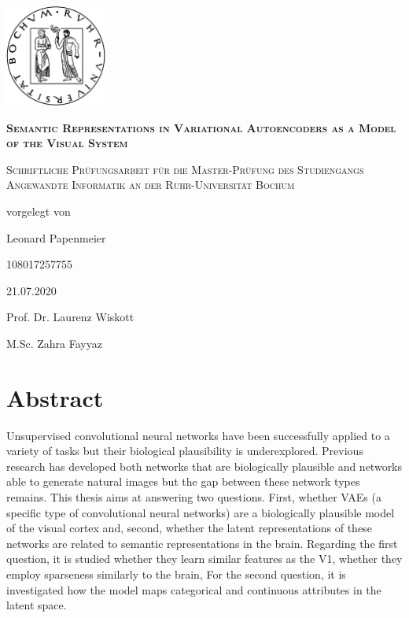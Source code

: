 \documentclass[11pt,a4paper]{article}
\let\oldsection\section
\renewcommand\section{\clearpage\oldsection}
\begin{document}
\begin{titlepage}
\centering
\includegraphics[width=0.25\textwidth]{rublogo.png}\par
{\scshape\huge\bfseries Semantic Representations in Variational Autoencoders as a Model of the Visual System \par}
{\scshape\large Schriftliche Prüfungsarbeit für die Master-Prüfung des Studiengangs Angewandte Informatik an der Ruhr-Universität Bochum\par}
\vspace{1em}
vorgelegt von\par
\vspace{2em}
Leonard Papenmeier\par 108017257755\par
\vspace{2em}
21.07.2020\par

\vfill
Prof. Dr. Laurenz Wiskott\par
M.Sc. Zahra Fayyaz


\end{titlepage}


\section*{\centering Abstract}
Unsupervised convolutional neural networks have been successfully applied to a variety of tasks but their biological plausibility is underexplored.
Previous research has developed both networks that are biologically plausible and networks able to generate natural images but the gap between these network types remains.
This thesis aims at answering two questions.
First, whether \acp{VAE} (a specific type of convolutional neural networks) are a biologically plausible model of the visual cortex and, second, whether the latent representations of these networks are related to semantic representations in the brain.
Regarding the first question, it is studied whether they learn similar features as the \ac{V1}, whether they employ sparseness similarly to the brain,
For the second question, it is investigated how the model maps categorical and continuous attributes in the latent space.
\end{document}

